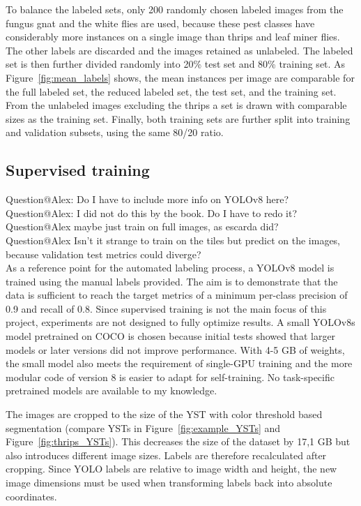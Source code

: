 \documentclass[12pt,a4paper]{article}
\begin{document}
To balance the labeled sets, only 200 randomly chosen labeled images from the fungus gnat and the white flies are used, because these pest classes have considerably more instances on a single image than thrips and leaf miner flies. The other labels are discarded and the images retained as unlabeled. The labeled set is then further divided randomly into 20\% test set and 80\% training set. As Figure~\ref{fig:mean_labels} shows, the mean instances per image are comparable for the full labeled set, the reduced labeled set, the test set, and the training set. From the unlabeled images excluding the thrips a set is drawn with comparable sizes as the training set. Finally, both training sets are further split into training and validation subsets, using the same 80/20 ratio.

\subsection{Supervised training}

{\color{red} Question@Alex: Do I have to include more info on YOLOv8 here?}\\
{\color{red} Question@Alex: I did not do this by the book. Do I have to redo it?}\\
{\color{red} Question@Alex maybe just train on full images, as escarda did?}\\
{\color{red} Question@Alex Isn't it strange to train on the tiles but predict on the images, because validation test metrics could diverge?}\\
As a reference point for the automated labeling process, a YOLOv8 model is trained using the manual labels provided. The aim is to demonstrate that the data is sufficient to reach the target metrics of a minimum per-class precision of 0.9 and recall of 0.8. Since supervised training is not the main focus of this project, experiments are not designed to fully optimize results. A small YOLOv8s model pretrained on COCO is chosen because initial tests showed that larger models or later versions did not improve performance. With 4-5 GB of weights, the small model also meets the requirement of single-GPU training and the more modular code of version 8 is easier to adapt for self-training. No task-specific pretrained models are available to my knowledge. 

The images are cropped to the size of the YST with color threshold based segmentation (compare YSTs in Figure~\ref{fig:example_YSTs} and Figure~\ref{fig:thrips_YSTs}). This decreases the size of the dataset by 17,1 GB but also introduces different image sizes. Labels are therefore recalculated after cropping. Since YOLO labels are relative to image width and height, the new image dimensions must be used when transforming labels back into absolute coordinates. 
\end{document}
